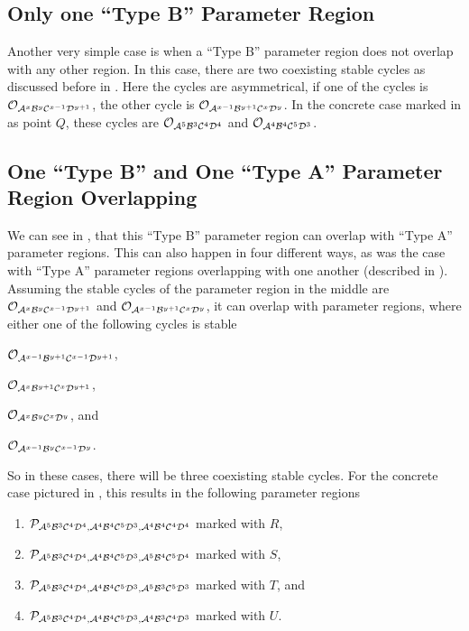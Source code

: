 \subsection{Only one ``Type B'' Parameter Region}

Another very simple case is when a ``Type B'' parameter region does not overlap with any other region.
In this case, there are two coexisting stable cycles as discussed before in .
Here the cycles are asymmetrical, if one of the cycles is $\mathcal{O}_{\mathcal{A}^x\mathcal{B}^y\mathcal{C}^{x-1}\mathcal{D}^{y+1}}$, the other cycle is $\mathcal{O}_{\mathcal{A}^{x-1}\mathcal{B}^{y+1}\mathcal{C}^x\mathcal{D}^y}$.
In the concrete case marked in  as point $Q$, these cycles are $\mathcal{O}_{\mathcal{A}^5\mathcal{B}^3\mathcal{C}^4\mathcal{D}^4}$ and $\mathcal{O}_{\mathcal{A}^4\mathcal{B}^4\mathcal{C}^5\mathcal{D}^3}$.

\subsection{One ``Type B'' and One ``Type A'' Parameter Region Overlapping}
\label{sec:minrep.coex.BA}

We can see in , that this ``Type B'' parameter region can overlap with ``Type A'' parameter regions.
This can also happen in four different ways, as was the case with ``Type A'' parameter regions overlapping with one another (described in ).
Assuming the stable cycles of the parameter region in the middle are $\mathcal{O}_{\mathcal{A}^x\mathcal{B}^y\mathcal{C}^{x-1}\mathcal{D}^{y+1}}$ and $\mathcal{O}_{\mathcal{A}^{x-1}\mathcal{B}^{y+1}\mathcal{C}^x\mathcal{D}^y}$, it can overlap with parameter regions, where either one of the following cycles is stable
\begin{enumerate*}
    \item $\mathcal{O}_{\mathcal{A}^{x-1}\mathcal{B}^{y+1}\mathcal{C}^{x-1}\mathcal{D}^{y+1}}$,
    \item $\mathcal{O}_{\mathcal{A}^x\mathcal{B}^{y+1}\mathcal{C}^x\mathcal{D}^{y+1}}$,
    \item $\mathcal{O}_{\mathcal{A}^x\mathcal{B}^y\mathcal{C}^x\mathcal{D}^y}$, and
    \item $\mathcal{O}_{\mathcal{A}^{x-1}\mathcal{B}^y\mathcal{C}^{x-1}\mathcal{D}^y}$.
\end{enumerate*}
So in these cases, there will be three coexisting stable cycles.
For the concrete case pictured in , this results in the following parameter regions
\begin{enumerate}
    \item $\mathcal{P}_{\mathcal{A}^5\mathcal{B}^3\mathcal{C}^4\mathcal{D}^4, \mathcal{A}^4\mathcal{B}^4\mathcal{C}^5\mathcal{D}^3, \mathcal{A}^4\mathcal{B}^4\mathcal{C}^4\mathcal{D}^4}$ marked with $R$,
    \item $\mathcal{P}_{\mathcal{A}^5\mathcal{B}^3\mathcal{C}^4\mathcal{D}^4, \mathcal{A}^4\mathcal{B}^4\mathcal{C}^5\mathcal{D}^3, \mathcal{A}^5\mathcal{B}^4\mathcal{C}^5\mathcal{D}^4}$ marked with $S$,
    \item $\mathcal{P}_{\mathcal{A}^5\mathcal{B}^3\mathcal{C}^4\mathcal{D}^4, \mathcal{A}^4\mathcal{B}^4\mathcal{C}^5\mathcal{D}^3, \mathcal{A}^5\mathcal{B}^3\mathcal{C}^5\mathcal{D}^3}$ marked with $T$, and
    \item $\mathcal{P}_{\mathcal{A}^5\mathcal{B}^3\mathcal{C}^4\mathcal{D}^4, \mathcal{A}^4\mathcal{B}^4\mathcal{C}^5\mathcal{D}^3, \mathcal{A}^4\mathcal{B}^3\mathcal{C}^4\mathcal{D}^3}$ marked with $U$.
\end{enumerate}

